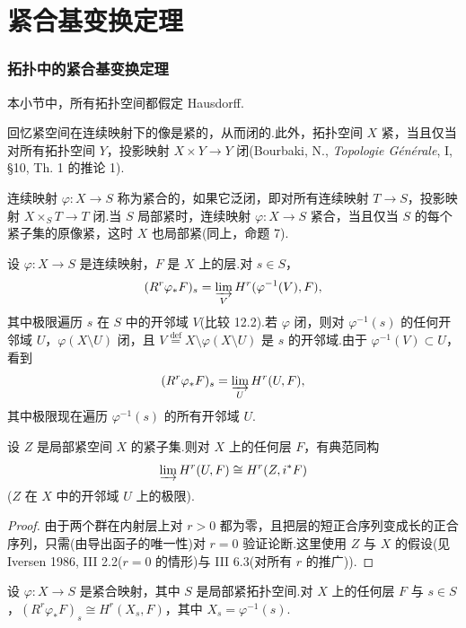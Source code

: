 ﻿%
\chapter{紧合基变换定理}\label{sec:17}

\subsection*{拓扑中的紧合基变换定理}

本小节中，所有拓扑空间都假定 Hausdorff.

回忆紧空间在连续映射下的像是紧的，从而闭的.此外，拓扑空间 $X$ 紧，当且仅当对所有拓扑空间 $Y$，投影映射 $X \times Y \to Y$ 闭(Bourbaki, N., \emph{Topologie G\'en\'erale}, I, \S 10, Th. 1 的推论 1).

连续映射 $\varphi \colon X \to S$ 称为紧合的，如果它泛闭，即对所有连续映射 $T \to S$，投影映射 $X \times_{S} T \to T$ 闭.当 $S$ 局部紧时，连续映射 $\varphi \colon X \to S$ 紧合，当且仅当 $S$ 的每个紧子集的原像紧，这时 $X$ 也局部紧(同上，命题 7).

设 $\varphi \colon X \to S$ 是连续映射，$F$ 是 $X$ 上的层.对 $s \in S$，
\[
(R^{r}\varphi_{*}F)_s = \varinjlim_{V} H^{r}(\varphi^{-1}(V), F),
\]
其中极限遍历 $s$ 在 $S$ 中的开邻域 $V$(比较 12.2).若 $\varphi$ 闭，则对 $\varphi^{-1}(s)$ 的任何开邻域 $U$，$\varphi(X \setminus U)$ 闭，且 $V \overset{\mathrm{def}}{=} X \setminus \varphi(X \setminus U)$ 是 $s$ 的开邻域.由于 $\varphi^{-1}(V) \subset U$，看到
\[
(R^{r}\varphi_{*}F)_s = \varinjlim_{U} H^{r}(U, F),
\]
其中极限现在遍历 $\varphi^{-1}(s)$ 的所有开邻域 $U$.

\begin{lemma}\label{lem:17.1}
设 $Z$ 是局部紧空间 $X$ 的紧子集.则对 $X$ 上的任何层 $F$，有典范同构
\[
\varinjlim H^{r}(U, F) \cong H^{r}(Z, i^{*}F)
\]
($Z$ 在 $X$ 中的开邻域 $U$ 上的极限).
\end{lemma}

\begin{proof}
由于两个群在内射层上对 $r > 0$ 都为零，且把层的短正合序列变成长的正合序列，只需(由导出函子的唯一性)对 $r = 0$ 验证论断.这里使用 $Z$ 与 $X$ 的假设(见 Iversen 1986, III 2.2($r = 0$ 的情形)与 III 6.3(对所有 $r$ 的推广)).
\end{proof}

\begin{theorem}\label{thm:17.2}
设 $\varphi \colon X \to S$ 是紧合映射，其中 $S$ 是局部紧拓扑空间.对 $X$ 上的任何层 $F$ 与 $s \in S$，$(R^{r}\varphi_{*}F)_s \cong H^{r}(X_s, F)$，其中 $X_s = \varphi^{-1}(s)$.
\end{theorem}

